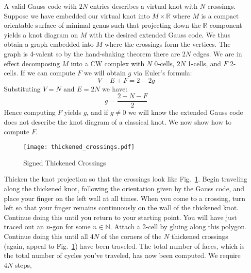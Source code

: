         A valid Gauss code with $2N$ entries describes a virtual knot with
        $N$ crossings. Suppose we have embedded our virtual knot into
        $M\times\mathbb{R}$ where $M$ is a compact orientable surface of
        minimal genus such that projecting down the $\mathbb{R}$ component
        yields a knot diagram on $M$ with the desired extended Gauss code.
        We thus obtain a graph embedded into $M$ where the crossings form the
        vertices. The graph is 4-valent so by the hand-shaking theorem there
        are $2N$ edges. We are in effect decomposing $M$ into a CW complex with
        $N$ 0-cells, $2N$ 1-cells, and $F$ 2-cells. If we can compute $F$ we
        will obtain $g$ via Euler's formula:
        \begin{equation}
            V-E+F=2-2g
        \end{equation}
        Substituting $V=N$ and $E=2N$ we have:
        \begin{equation}
            g=\frac{2+N-F}{2}
        \end{equation}
        Hence computing $F$ yields $g$, and if $g\ne{0}$ we will know the
        extended Gauss code does not describe the knot diagram of a
        classical knot. We now show how to compute $F$.
        \par\hfill\par
        \begin{figure}
            \centering
            \texttt{[image: thickened\_crossings.pdf]}
            \caption{Signed Thickened Crossings}
            \label{fig:thickened_crossings_chapt1}
        \end{figure}
        Thicken the knot projection so that the crossings look like
        Fig.~\ref{fig:thickened_crossings_chapt1}.
        Begin traveling along the thickened
        knot, following the orientation given by the Gauss code, and place your
        finger on the left wall at all times. When you come to a crossing,
        turn left so that your finger remains continuously on the wall of the
        thickened knot. Continue doing this until you return to your starting
        point. You will have just traced out an $n$-gon for some
        $n\in\mathbb{N}$. Attach a 2-cell by gluing along this polygon.
        Continue doing this until all $4N$ of the corners of the $N$ thickened
        crossings (again, appeal to
        Fig.~\ref{fig:thickened_crossings_chapt1}) have
        been traveled. The total number of faces, which is the total number of
        cycles you've traveled, has now been computed. We require $4N$ steps,
